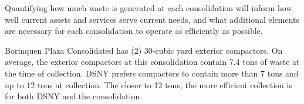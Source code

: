 
    Quantifying how much waste is generated at each consolidation will inform how well current assets and services serve current needs, and what additional elements are necessary for each consolidation to operate as efficiently as possible.
    
    Borinquen Plaza Consolidated has (2) 30-cubic yard exterior compactors. On average, the exterior compactors at this consolidation contain 7.4 tons of waste at the time of collection. DSNY prefers compactors to contain more than 7 tons and up to 12 tons at collection. The closer to 12 tons, the more efficient collection is for both DSNY and the consolidation.